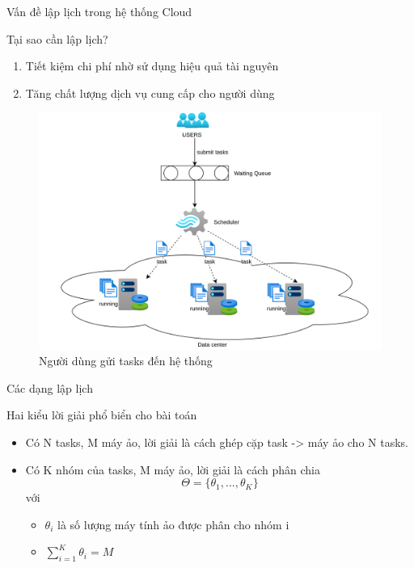 \documentclass[11pt,xcolor={dvipsnames}, aspectratio=169]{beamer}
\begin{document}
\begin{frame}
{Vấn đề lập lịch trong hệ thống Cloud}
\begin{minipage}[t]{0.48\linewidth}
	\vspace{1cm}
	\begin{block}
	{Tại sao cần lập lịch?}
	\begin{enumerate}
		\item Tiết kiệm chi phí nhờ sử dụng hiệu quả tài nguyên 
		\item Tăng chất lượng dịch vụ cung cấp cho người dùng
	\end{enumerate}
	\end{block}
\end{minipage}
\hfill
\begin{minipage}[t]{0.48\linewidth}
	\begin{figure}
		\centering
		\includegraphics[scale=0.4]{images/basic_flow.png}
		\caption{Người dùng gửi tasks đến hệ thống}
	\end{figure}
\end{minipage}
\end{frame}

\begin{frame}
{Các dạng lập lịch}
\begin{block}
{Hai kiểu lời giải phổ biển cho bài toán}
\begin{itemize}
	\item Có N tasks, M máy ảo, lời giải là cách ghép cặp task -> máy ảo cho N tasks. 
	\item Có K nhóm của tasks, M máy ảo, lời giải là cách phân chia 
		\[
			\Theta = \{\theta_{1}, ..., \theta_{K}\}
		\]
		với \begin{itemize}
			\item $\theta_{i}$ là số lượng máy tính ảo được phân cho nhóm i 
			\item $\sum_{i = 1}^{K}\theta_{i} = M$
		\end{itemize}
\end{itemize}
\end{block}
\end{frame}
\end{document}
